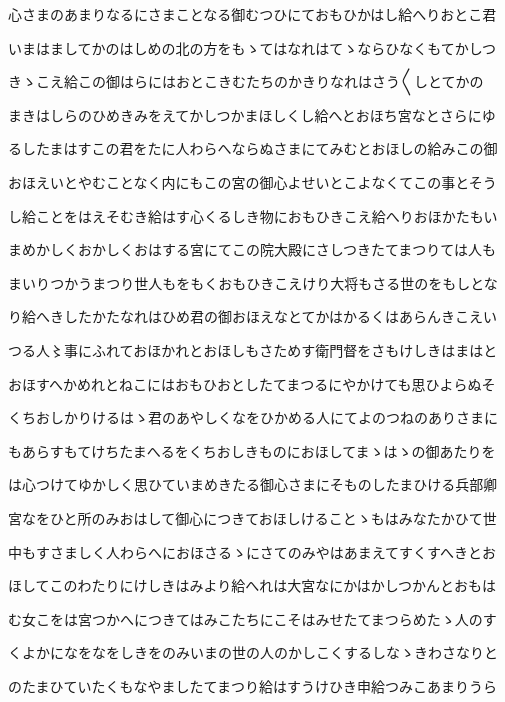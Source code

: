 \documentclass[a4paper,11pt,landscape]{ltjtarticle}
\begin{document}
心さまのあまりなるにさまことなる御むつひにておもひかはし給へりおとこ君
\par\medskip
いまはましてかのはしめの北の方をもゝてはなれはてゝならひなくもてかしつ
\par\medskip
きゝこえ給この御はらにはおとこきむたちのかきりなれはさう〱しとてかの
\par\medskip
まきはしらのひめきみをえてかしつかまほしくし給へとおほち宮なとさらにゆ
\par\medskip
るしたまはすこの君をたに人わらへならぬさまにてみむとおほしの給みこの御
\par\medskip
おほえいとやむことなく内にもこの宮の御心よせいとこよなくてこの事とそう
\par\medskip
し給ことをはえそむき給はす心くるしき物におもひきこえ給へりおほかたもい
\par\medskip
まめかしくおかしくおはする宮にてこの院大殿にさしつきたてまつりては人も
\par\medskip
まいりつかうまつり世人もをもくおもひきこえけり大将もさる世のをもしとな
\par\medskip
り給へきしたかたなれはひめ君の御おほえなとてかはかるくはあらんきこえい
\par\medskip
つる人〻事にふれておほかれとおほしもさためす衛門督をさもけしきはまはと
\par\medskip
おほすへかめれとねこにはおもひおとしたてまつるにやかけても思ひよらぬそ
\par\medskip
くちおしかりけるはゝ君のあやしくなをひかめる人にてよのつねのありさまに
\par\medskip
もあらすもてけちたまへるをくちおしきものにおほしてまゝはゝの御あたりを
\par\medskip
は心つけてゆかしく思ひていまめきたる御心さまにそものしたまひける兵部卿
\par\medskip
宮なをひと所のみおはして御心につきておほしけることゝもはみなたかひて世
\par\medskip
中もすさましく人わらへにおほさるゝにさてのみやはあまえてすくすへきとお
\par\medskip
ほしてこのわたりにけしきはみより給へれは大宮なにかはかしつかんとおもは
\par\medskip
む女こをは宮つかへにつきてはみこたちにこそはみせたてまつらめたゝ人のす
\par\medskip
くよかになをなをしきをのみいまの世の人のかしこくするしなゝきわさなりと
\par\medskip
のたまひていたくもなやましたてまつり給はすうけひき申給つみこあまりうら
\par\medskip
\end{document}
